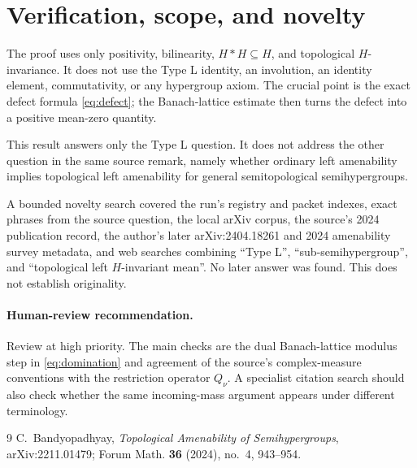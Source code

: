 \documentclass[11pt]{article}
\begin{document}
\section{Verification, scope, and novelty}

The proof uses only positivity, bilinearity, $H*H\subseteq H$, and topological
$H$-invariance.  It does not use the Type L identity, an involution, an
identity element, commutativity, or any hypergroup axiom.  The crucial point is
the exact defect formula \eqref{eq:defect}; the Banach-lattice estimate then
turns the defect into a positive mean-zero quantity.

This result answers only the Type L question.  It does not address the other
question in the same source remark, namely whether ordinary left amenability
implies topological left amenability for general semitopological
semihypergroups.

A bounded novelty search covered the run's registry and packet indexes, exact
phrases from the source question, the local arXiv corpus, the source's 2024
publication record, the author's later arXiv:2404.18261 and 2024 amenability
survey metadata, and web searches combining ``Type L'', ``sub-semihypergroup'',
and ``topological left $H$-invariant mean''.  No later answer was found.  This
does not establish originality.

\paragraph{Human-review recommendation.}
Review at high priority.  The main checks are the dual Banach-lattice modulus
step in \eqref{eq:domination} and agreement of the source's complex-measure
conventions with the restriction operator $Q_\nu$.  A specialist citation
search should also check whether the same incoming-mass argument appears under
different terminology.

\begin{thebibliography}{9}
C.~Bandyopadhyay,
\emph{Topological Amenability of Semihypergroups},
arXiv:2211.01479; Forum Math. \textbf{36} (2024), no.~4, 943--954.
\end{thebibliography}
\end{document}
